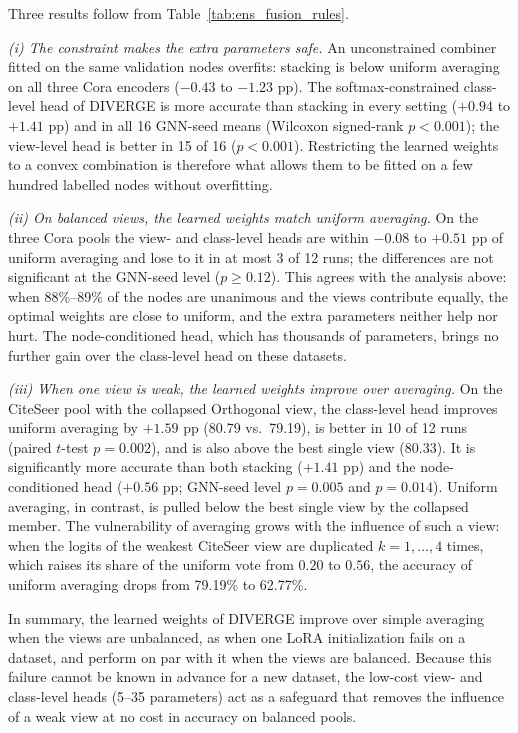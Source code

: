 \documentclass[a4paper,fleqn]{cas-sc}
\DeclareRobustCommand{\revcommon}[2][]{\textcolor{revshared}{#2}} %
\begin{document}
\revcommon[R1,R2,R4]{Three results follow from Table~\ref{tab:ens_fusion_rules}.}

\revcommon[R1,R2,R4]{\textit{(i) The constraint makes the extra parameters safe.} An unconstrained combiner fitted on the same validation nodes overfits: stacking is below uniform averaging on all three Cora encoders ($-0.43$ to $-1.23$ pp). The softmax-constrained class-level head of DIVERGE is more accurate than stacking in every setting ($+0.94$ to $+1.41$ pp) and in all 16 GNN-seed means (Wilcoxon signed-rank $p<0.001$); the view-level head is better in 15 of 16 ($p<0.001$). Restricting the learned weights to a convex combination is therefore what allows them to be fitted on a few hundred labelled nodes without overfitting.}

\revcommon[R1,R2,R4]{\textit{(ii) On balanced views, the learned weights match uniform averaging.} On the three Cora pools the view- and class-level heads are within $-0.08$ to $+0.51$ pp of uniform averaging and lose to it in at most 3 of 12 runs; the differences are not significant at the GNN-seed level ($p\geq0.12$). This agrees with the analysis above: when 88\%--89\% of the nodes are unanimous and the views contribute equally, the optimal weights are close to uniform, and the extra parameters neither help nor hurt. The node-conditioned head, which has thousands of parameters, brings no further gain over the class-level head on these datasets.}

\revcommon[R1,R2,R4]{\textit{(iii) When one view is weak, the learned weights improve over averaging.} On the CiteSeer pool with the collapsed Orthogonal view, the class-level head improves uniform averaging by $+1.59$ pp (80.79 vs.\ 79.19), is better in 10 of 12 runs (paired $t$-test $p=0.002$), and is also above the best single view (80.33). It is significantly more accurate than both stacking ($+1.41$ pp) and the node-conditioned head ($+0.56$ pp; GNN-seed level $p=0.005$ and $p=0.014$). Uniform averaging, in contrast, is pulled below the best single view by the collapsed member. The vulnerability of averaging grows with the influence of such a view: when the logits of the weakest CiteSeer view are duplicated $k=1,\dots,4$ times, which raises its share of the uniform vote from $0.20$ to $0.56$, the accuracy of uniform averaging drops from 79.19\% to 62.77\%.}

\revcommon[R1,R2,R4]{In summary, the learned weights of DIVERGE improve over simple averaging when the views are unbalanced, as when one LoRA initialization fails on a dataset, and perform on par with it when the views are balanced. Because this failure cannot be known in advance for a new dataset, the low-cost view- and class-level heads (5--35 parameters) act as a safeguard that removes the influence of a weak view at no cost in accuracy on balanced pools.}
\end{document}
